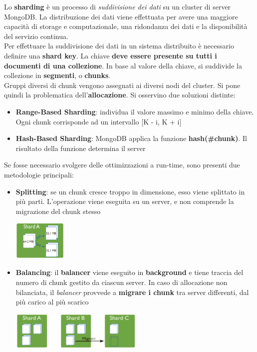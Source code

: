 \documentclass{article}
\begin{document}
Lo \textbf{sharding} è un processo di \textit{suddivisione dei dati} su un cluster di server MongoDB. La distribuzione dei dati viene effettuata per avere una maggiore capacità di storage e computazionale, una ridondanza dei dati e la disponibilità del servizio continua.\\
Per effettuare la suddivisione dei dati in un sistema distribuito è necessario definire una \textbf{shard key}. La chiave \textbf{deve essere presente su tutti i documenti di una collezione}. In base al valore della chiave, si suddivide la collezione in \textbf{segmenti}, o \textbf{chunks}.\\
Gruppi diversi di chunk vengono assegnati ai diversi nodi del cluster. Si pone quindi la problematica dell'\textbf{allocazione}. Si osservino due soluzioni distinte:
\begin{itemize}[label={-}, leftmargin=1cm]
    \itemsep0em
    \item \textbf{Range-Based Sharding}: individua il valore massimo e minimo della chiave. Ogni chunk corrisponde ad un intervallo [K - i, K + i]
    \item \textbf{Hash-Based Sharding}: MongoDB applica la funzione \textbf{hash(\#chunk)}. Il risultato della funzione determina il server
\end{itemize}
Se fosse necessario svolgere delle ottimizzazioni a run-time, sono presenti due metodologie principali:
\begin{itemize}[label={-}, leftmargin=1cm]
    \itemsep0em
    \item \textbf{Splitting}: se un chunk cresce troppo in dimensione, esso viene splittato in più parti. L'operazione viene eseguita su un server, e non comprende la migrazione del chunk stesso
    \begin{center}
        \includegraphics[width=0.2\textwidth]{foto 6.png}
    \end{center}
    \item \textbf{Balancing}: il \textbf{balancer} viene eseguito in \textbf{background} e tiene traccia del numero di chunk gestito da ciascun server. In caso di allocazione non bilanciata, il \textit{balancer} provvede a \textbf{migrare i chunk} tra server differenti, dal più carico al più scarico
    \begin{center}
        \includegraphics[width=0.5\textwidth]{foto 7.png}
    \end{center}
\end{itemize}
\end{document}
